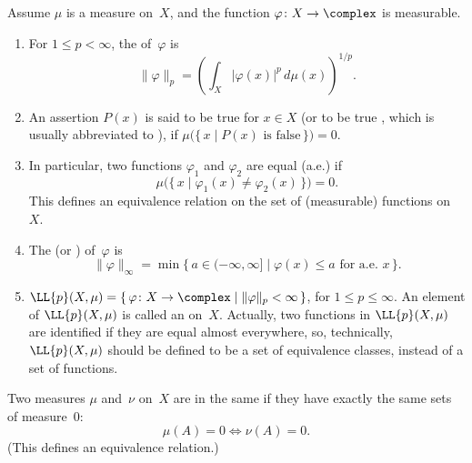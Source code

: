 \begin{defns}
Assume  $\mu$ is a measure on~$X$, and the function $\varphi \colon X \to \complex$ is measurable.

	\begin{enumerate}
	\item For $1 \le p < \infty$, the  of~$\varphi$ is 
	$$ \|\varphi\|_p = \left( \int_{X} |\varphi(x)|^p \, d\mu(x) \right) ^{1/p} .$$
	
	\item An assertion $P(x)$ is said to be true for  $x \in X$ (or to be true , which is usually abbreviated to ),  if $\mu \bigl( \{\, x \mid \text{$P(x)$ is false}\,\} \bigr) = 0$.
	
	\item In particular, two functions $\varphi_1$ and $\varphi_2$ are equal (a.e.) if 
		$$\mu\bigl( \{\, x \mid \varphi_1(x) \neq \varphi_2(x) \,\} \bigr) = 0 .$$ 
	This defines an equivalence relation on the set of (measurable) functions on~$X$.

	\item The  (or ) of~$\varphi$ is 
	$$ \|\varphi\|_\infty = \min \bigl\{\, a \in (-\infty, \infty] \mid \text{$\varphi(x) \le a$ for a.e.~$x$} \,\bigr\} .$$

	\item {}
	$ \LL{p}(X,\mu) = \{\, \varphi \colon X \to \complex \mid \| \varphi \|_p < \infty \,\} $, for $1 \le p \le \infty$. An element of $\LL{p}(X,\mu)$ is called an  on~$X$. Actually, two functions in $\LL{p}(X,\mu)$ are identified if they are equal almost everywhere, so, technically, $\LL{p}(X,\mu)$ should be defined to be a set of equivalence classes, instead of a set of functions.
	
	\end{enumerate}
\end{defns}


\begin{defn}
Two measures $\mu$ and~$\nu$ on~$X$ are in the same 
if they have exactly the same sets of measure~$0$:
		$$ \mu(A) = 0 \iff \nu(A) = 0 .$$
	(This defines an equivalence relation.) 
\end{defn}

